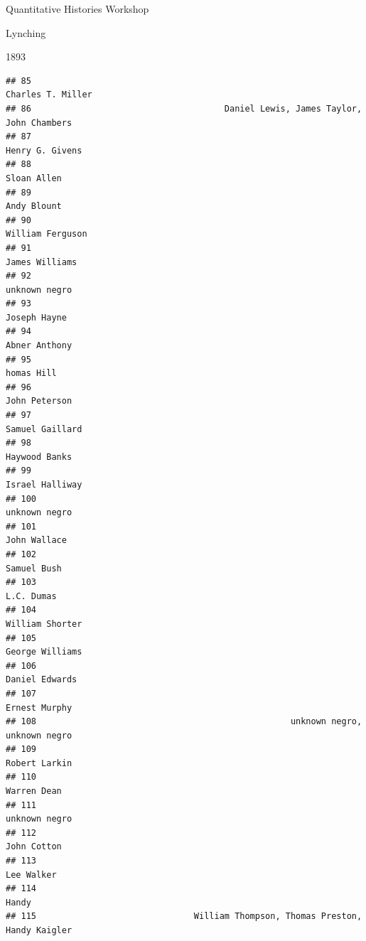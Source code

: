 \documentclass[
  ignorenonframetext,
]{beamer}
\begin{document}
\begin{frame}[fragile]{Quantitative Histories Workshop}
\begin{block}{Lynching}
\begin{block}{1893}
\begin{verbatim}
## 85                                                              Charles T. Miller
## 86                                      Daniel Lewis, James Taylor, John Chambers
## 87                                                                Henry G. Givens
## 88                                                                    Sloan Allen
## 89                                                                    Andy Blount
## 90                                                               William Ferguson
## 91                                                                 James Williams
## 92                                                                  unknown negro
## 93                                                                   Joseph Hayne
## 94                                                                  Abner Anthony
## 95                                                                     homas Hill
## 96                                                                  John Peterson
## 97                                                                Samuel Gaillard
## 98                                                                  Haywood Banks
## 99                                                                Israel Halliway
## 100                                                                 unknown negro
## 101                                                                  John Wallace
## 102                                                                   Samuel Bush
## 103                                                                    L.C. Dumas
## 104                                                               William Shorter
## 105                                                               George Williams
## 106                                                                Daniel Edwards
## 107                                                                 Ernest Murphy
## 108                                                  unknown negro, unknown negro
## 109                                                                 Robert Larkin
## 110                                                                   Warren Dean
## 111                                                                 unknown negro
## 112                                                                   John Cotton
## 113                                                                    Lee Walker
## 114                                                                         Handy
## 115                               William Thompson, Thomas Preston, Handy Kaigler

\end{verbatim}
\end{block}
\end{block}
\end{frame}
\end{document}
